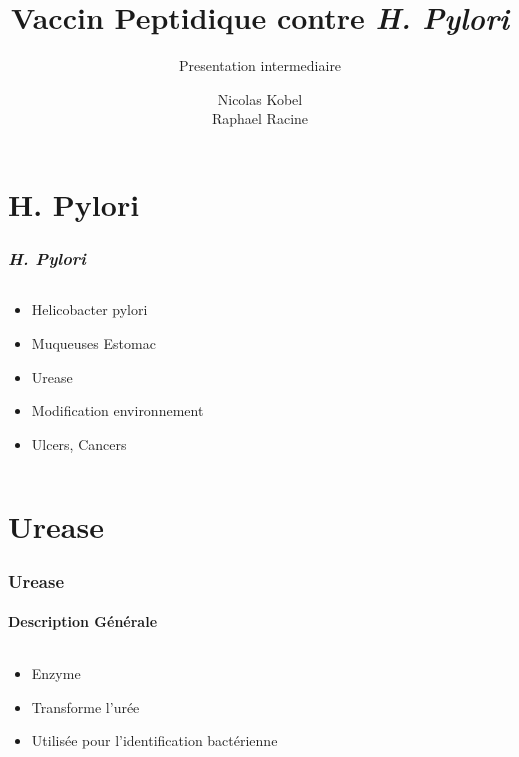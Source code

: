 \documentclass[11pt, notes]{beamer}
\author{Nicolas Kobel \\Raphael Racine}
\title{Vaccin Peptidique contre \textit{H. Pylori}}
\subtitle{Presentation intermediaire}
\newcommand{\hpyl}{\textit{H. Pylori}}
\begin{document}
\begin{frame}
\titlepage
\end{frame}

\begin{frame}
\tableofcontents
\end{frame}

\section{H. Pylori}
\begin{frame}
\frametitle{\hpyl}
\begin{columns}[c]
	\begin{column}[c]{5cm}
		\begin{itemize}[<+->]
			\item Helicobacter pylori
			\item Muqueuses Estomac
			\item Urease
			\item Modification environnement
			\item Ulcers, Cancers
		\end{itemize}
	\end{column}
	\begin{column}[c]{5cm}
	\end{column}
\end{columns}
\end{frame}

\section{Urease}
\begin{frame}
\frametitle{Urease}
\framesubtitle{Description Générale}
\begin{columns}[c]
	\begin{column}[c]{5cm}
		\begin{itemize}[<+->]
			\item Enzyme
			\item Transforme l'urée
			\item Utilisée pour l'identification bactérienne
		\end{itemize}
	\end{column}
	\begin{column}[c]{5cm}
	\end{column}
\end{columns}
\end{frame}
\end{document}
